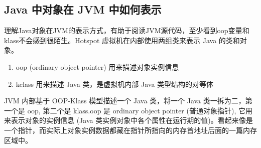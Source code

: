\documentclass[../../../interview-questions.tex]{subfiles}
\begin{document}
\subsection{Java 中对象在 JVM 中如何表示}

理解Java对象在JVM的表示方式，有助于阅读JVM源代码，至少看到oop变量和klass不会感到很陌生。Hotspot 虚拟机在内部使用两组类来表示 Java 的类和对象。

\begin{enumerate}
    \item {oop (ordinary object pointer) 用来描述对象实例信息}
    \item {kclass 用来描述 Java 类，是虚拟机内部 Java 类型结构的对等体}
\end{enumerate}

JVM 内部基于 OOP-Klass 模型描述一个 Java 类，将一个 Java 类一拆为二，第一个是 oop, 第二个是 klass.oop 是 ordinary object pointer (普通对象指针), 它用来表示对象的实例信息 (Java 类实例对象中各个属性在运行期的值)。看起来像是一个指针，而实际上对象实例数据都藏在指针所指向的内存首地址后面的一篇内存区域中。
\end{document}
